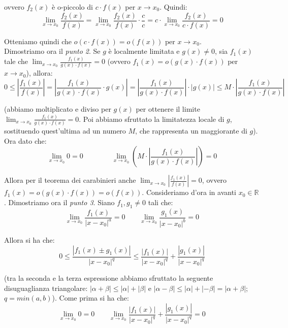 \documentclass{article}
\begin{document}
\noindent ovvero $f_2(x)$ è o-piccolo di $c \cdot f(x)$ per $x \to x_0$. Quindi:
\begin{equation*}
    \lim_{x \to x_0} \frac{f_2(x)}{f(x)} = \lim_{x \to x_0} \frac{f_2(x)}{f(x)} \cdot \frac{c}{c} = c \cdot \lim_{x \to x_0} \frac{f_2(x)}{c \cdot f(x)} = 0
\end{equation*}

\noindent Otteniamo quindi che $o(c \cdot f(x)) = o(f(x))$ per $x \to x_0$.\\
Dimostriamo ora il \textit{punto 2}. Se $g$ è localmente limitata e $g(x) \neq 0$, sia $f_1(x)$ tale che $\lim_{x \to x_0} \frac{f_1(x)}{g(x) \cdot f(x)} = 0$ (ovvero $f_1(x) = o(g(x) \cdot f(x))$ per $x \to x_0$), allora:
\begin{equation*}
    0 \leq \left|\frac{f_1(x)}{f(x)}\right| = \left|\frac{f_1(x)}{g(x) \cdot f(x)} \cdot g(x)\right| = \left|\frac{f_1(x)}{g(x) \cdot f(x)}\right| \cdot |g(x)| \leq M \cdot \left|\frac{f_1(x)}{g(x) \cdot f(x)}\right|
\end{equation*}

\noindent (abbiamo moltiplicato e diviso per $g(x)$ per ottenere il limite $\lim_{x \to x_0} \frac{f_1(x)}{g(x) \cdot f(x)} = 0$. Poi abbiamo sfruttato la limitatezza locale di $g$, sostituendo quest'ultima ad un numero $M$, che rappresenta un maggiorante di $g$). Ora dato che:
\begin{equation*}
    \lim_{x \to x_0} 0 = 0 \qquad \qquad \lim_{x \to x_0} \left(M \cdot \left|\frac{f_1(x)}{g(x) \cdot f(x)}\right|\right) = 0
\end{equation*}

\noindent Allora per il teorema dei carabinieri anche $\lim_{x \to x_0} \left|\frac{f_1(x)}{f(x)}\right| = 0$, ovvero $f_1(x) = o(g(x) \cdot f(x)) = o(f(x))$.
Consideriamo d'ora in avanti $x_0 \in \mathbb{R}$. Dimostriamo ora il \textit{punto 3}. Siano $f_1, g_1 \neq 0$ tali che:
\begin{equation*}
    \lim_{x \to x_0} \frac{f_1(x)}{|x - x_0|^a} = 0 \qquad \lim_{x \to x_0} \frac{g_1(x)}{|x - x_0|^b} = 0
\end{equation*}

\noindent Allora si ha che:
\begin{equation*}
    0 \leq \frac{|f_1(x) \pm g_1(x)|}{|x - x_0|^q} \leq \frac{|f_1(x)|}{|x - x_0|^q} + \frac{|g_1(x)|}{|x - x_0|^q}
\end{equation*}

\noindent (tra la seconda e la terza espressione abbiamo sfruttato la seguente disuguaglianza triangolare: $|\alpha + \beta| \leq |\alpha| +|\beta|$ e $|\alpha - \beta| \leq |\alpha| + |-\beta| = |\alpha + \beta|$; $q = min(a, b)$). Come prima si ha che:
\begin{equation*}
    \lim_{x \to x_0} 0 = 0 \qquad \lim_{x \to x_0} \frac{|f_1(x)|}{|x - x_0|^q} + \frac{|g_1(x)|}{|x - x_0|^q} = 0
\end{equation*}
\end{document}
